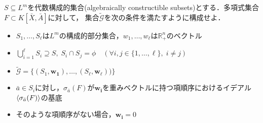 \newpage
\begin{problem}
	$S \subseteq L^m$を代数構成的集合(algebraically constructible subsets)とする．多項式集合$F \subset K[\bar{X}, \bar{A}]$に対して，
	集合$\tilde{\mathcal{G}}$を次の条件を満たすように構成せよ．
	\begin{itemize}
		\item $S_1, \dots, S_\ell$は$L^m$の構成的部分集合，$w_1, \dots, w_\ell$は$\mathbb{R}_+^{n}$のベクトル
		\item $\displaystyle \bigcup_{i=1}^\ell S_i \supseteq S, \; S_i \cap S_j = \phi \quad (\forall i, j \in \{1, \dots, \ell\}, \; i \ne j)$
		\item $\tilde{\mathcal{G}} = \{(S_1, \bm{w_1}), \dots, (S_\ell, \bm{w_\ell}))\}$
		\item $\bar{a} \in S_i$に対し，$\sigma_{\bar{a}}(F)$が$\bm{w_i}$を重みベクトルに持つ項順序におけるイデアル$\langle \sigma_{\bar{a}}(F) \rangle$の\groebner{}基底
		\item そのような項順序がない場合，$\bm{w_i} = 0$
	\end{itemize}
\end{problem}











